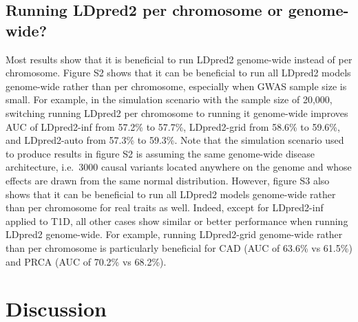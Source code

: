 \documentclass{bioinfo}
\begin{document}
\subsection*{Running LDpred2 per chromosome or genome-wide?}

Most results show that it is beneficial to run LDpred2 genome-wide instead of per chromosome.
Figure S2 shows that it can be beneficial to run all LDpred2 models genome-wide rather than per chromosome, especially when GWAS sample size is small.
For example, in the simulation scenario with the sample size of 20,000, switching running LDpred2 per chromosome to running it genome-wide improves AUC of LDpred2-inf from 57.2\% to 57.7\%, LDpred2-grid from 58.6\% to 59.6\%, and LDpred2-auto from 57.3\% to 59.3\%.
Note that the simulation scenario used to produce results in figure S2 is assuming the same genome-wide disease architecture, i.e.\ 3000 causal variants located anywhere on the genome and whose effects are drawn from the same normal distribution.
However, figure S3 also shows that it can be beneficial to run all LDpred2 models genome-wide rather than per chromosome for real traits as well. 
Indeed, except for LDpred2-inf applied to T1D, all other cases show similar or better performance when running LDpred2 genome-wide. 
For example, running LDpred2-grid genome-wide rather than per chromosome is particularly beneficial for CAD (AUC of 63.6\% vs 61.5\%) and PRCA (AUC of 70.2\% vs 68.2\%).



\section{Discussion}
\end{document}
